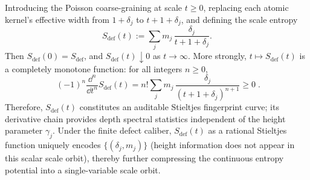 \begin{proposition}
Introducing the Poisson coarse-graining at scale \(t\ge0\), replacing each atomic kernel's effective width from \(1+\delta_j\) to \(t+1+\delta_j\), and defining the scale entropy
\[
S_{\mathrm{def}}(t):=\sum_{j}m_j\,\frac{\delta_j}{t+1+\delta_j}.
\]
Then \(S_{\mathrm{def}}(0)=S_{\mathrm{def}}\), and \(S_{\mathrm{def}}(t)\downarrow 0\) as \(t\to\infty\).
More strongly, \(t\mapsto S_{\mathrm{def}}(t)\) is a completely monotone function: for all integers \(n\ge0\),
\[
\boxed{\;
(-1)^n\frac{\dd^n}{\dd t^n}S_{\mathrm{def}}(t)
=n!\sum_{j}m_j\,\frac{\delta_j}{(t+1+\delta_j)^{n+1}}\ge0\; }.
\]
Therefore, \(S_{\mathrm{def}}(t)\) constitutes an auditable Stieltjes fingerprint curve; its derivative chain provides depth spectral statistics independent of the height parameter \(\gamma_j\).
Under the finite defect caliber, \(S_{\mathrm{def}}(t)\) as a rational Stieltjes function uniquely encodes \(\{(\delta_j,m_j)\}\) (height information does not appear in this scalar scale orbit), thereby further compressing the continuous entropy potential into a single-variable scale orbit.
\end{proposition}



\endinput




